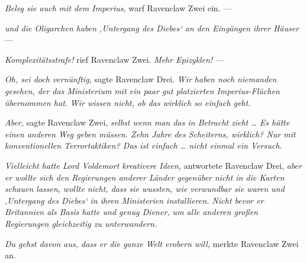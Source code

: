 \emph{Beleg sie auch mit dem Imperius,} warf Ravenclaw Zwei ein. —

\emph{und die Oligarchen haben ‚Untergang des Diebes‘ an den Eingängen ihrer Häuser} —

\emph{Komplexitätsstrafe!} rief Ravenclaw Zwei. \emph{Mehr Epizyklen!} —

\emph{Oh, sei doch vernünftig,} sagte Ravenclaw Drei. \emph{Wir haben noch niemanden gesehen, der das Ministerium mit ein paar gut platzierten Imperius-Flüchen übernommen hat.} \emph{Wir wissen nicht, ob das wirklich so einfach geht.}

\emph{Aber,} sagte Ravenclaw Zwei, \emph{selbst wenn man das in Betracht zieht … Es hätte einen anderen Weg geben müssen. Zehn Jahre des Scheiterns, wirklich? Nur mit konventionellen Terrortaktiken? Das ist einfach … nicht einmal ein Versuch.}

\emph{Vielleicht hatte Lord Voldemort kreativere Ideen,} antwortete Ravenclaw Drei, \emph{aber er wollte sich den Regierungen anderer Länder gegenüber nicht in die Karten schauen lassen, wollte nicht, dass sie wussten, wie verwundbar sie waren und ‚Untergang des Diebes‘ in ihren Ministerien installieren. Nicht bevor er Britannien als Basis hatte und genug Diener, um alle anderen großen Regierungen gleichzeitig zu unterwandern.}

\emph{Du gehst davon aus, dass er die ganze Welt erobern will,} merkte Ravenclaw Zwei an.

